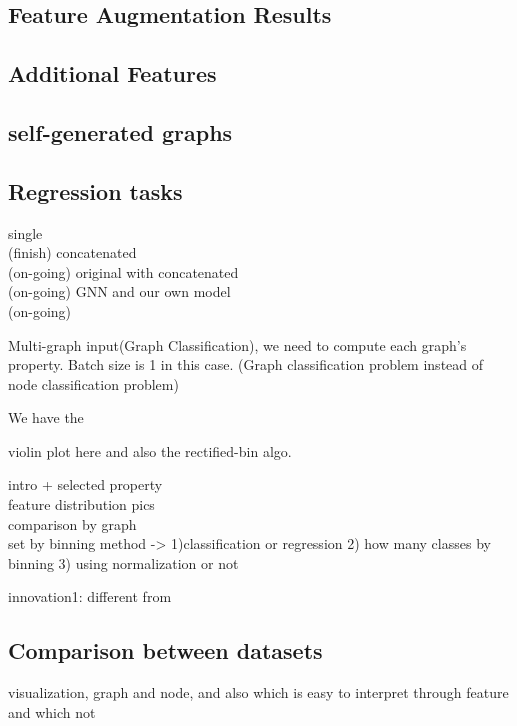\documentclass[sigconf]{acmart}
\begin{document}
\subsection{Feature Augmentation Results}

\subsection{Additional Features}



\subsection{self-generated graphs}

\paragraph{}

\subsection{Regression tasks}






single \\(finish)
concatenated\\(on-going)
original with concatenated\\(on-going)
GNN and our own model\\(on-going)






Multi-graph input(Graph Classification), we need to compute each graph's property. Batch size is 1 in this case. (Graph classification problem instead of node classification problem)


We have the 


violin plot here and also the rectified-bin algo.

intro  + selected property\\
feature distribution pics\\
comparison by graph \\
set by binning method -> 1)classification or regression 2) how many classes  by binning 3) using normalization or not



innovation1: different from 



\subsection{Comparison between datasets}
visualization, graph and node, and also which is easy to interpret through feature and which not
\end{document}
